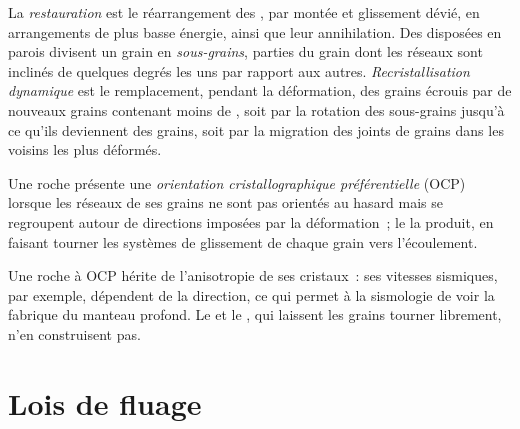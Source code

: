 \begin{definition}\label{def:b3:deformation-mechanisms:recrystallisation}
La \emph{restauration} est le réarrangement des
, par montée et glissement dévié, en arrangements de plus basse énergie, ainsi que leur
annihilation. Des  disposées en parois divisent un grain en
\emph{sous-grains}, parties du grain dont les réseaux sont inclinés
de quelques degrés les uns par rapport aux autres. \emph{Recristallisation
dynamique} est le remplacement, pendant la
déformation, des grains écrouis par de nouveaux grains contenant moins de , soit
par la rotation des sous-grains jusqu'à ce qu'ils deviennent des grains, soit par la migration
des joints de grains dans les voisins les plus déformés.
\end{definition}

\begin{definition}\label{def:b3:deformation-mechanisms:cpo}
Une roche présente une \emph{orientation cristallographique préférentielle}
(OCP) lorsque les réseaux de ses grains ne sont pas orientés
au hasard mais se regroupent autour de directions imposées par la déformation~; le  la produit, en faisant tourner les systèmes de glissement de chaque grain vers l'écoulement.
\end{definition}

Une roche à OCP hérite de l'anisotropie de ses cristaux~: ses vitesses sismiques, par exemple,
dépendent de la direction, ce qui permet à la sismologie de voir la fabrique
du manteau profond. Le  et le , qui laissent les grains
tourner librement, n'en construisent pas.

\section{Lois de fluage}

